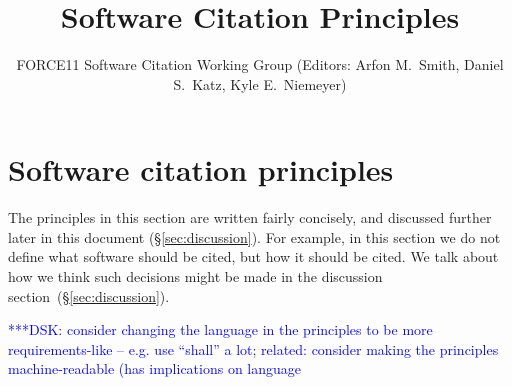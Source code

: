 \documentclass[11pt, oneside]{amsart}
\title{Software Citation Principles}
\author{FORCE11 Software Citation Working Group (Editors: Arfon M.~Smith, Daniel S.~Katz, Kyle E.~Niemeyer)}
\date{}
\newcommand{\katznote}[1]{ {\textcolor{blue} { ***DSK: #1 }}} %
\begin{document}
\begin{abstract}
\end{abstract}

\maketitle


\section{Software citation principles}
\label{sec:principles}

The principles in this section are written fairly concisely, and discussed
further later in this document (\S\ref{sec:discussion}). For example, in this
section we do not define what software should be cited, but how it should be
cited.  We talk about how we think such decisions might be made in the
discussion section~(\S\ref{sec:discussion}).

\katznote{consider changing the language in the principles to be more
requirements-like -- e.g. use ``shall'' a lot; related: consider making the
principles machine-readable (has implications on language}
\end{document}
